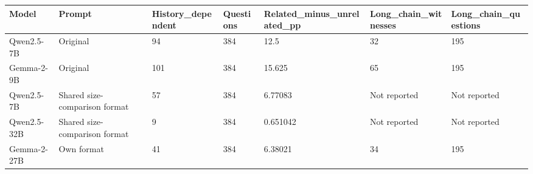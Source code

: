 \begin{tabular}{lllllll}
Model & Prompt & History\_dependent & Questions & Related\_minus\_unrelated\_pp & Long\_chain\_witnesses & Long\_chain\_questions \\
\hline
Qwen2.5-7B & Original & 94 & 384 & 12.5 & 32 & 195 \\
Gemma-2-9B & Original & 101 & 384 & 15.625 & 65 & 195 \\
Qwen2.5-7B & Shared size-comparison format & 57 & 384 & 6.77083 & Not reported & Not reported \\
Qwen2.5-32B & Shared size-comparison format & 9 & 384 & 0.651042 & Not reported & Not reported \\
Gemma-2-27B & Own format & 41 & 384 & 6.38021 & 34 & 195 \\
\end{tabular}
